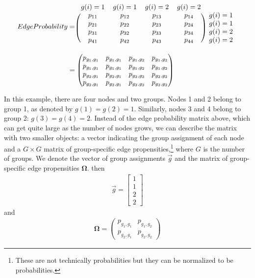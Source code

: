 \documentclass[12pt]{article}
\theoremstyle{definition}
\theoremstyle{plain}
\begin{document}
\begin{align*}
EdgeProbability &= 
\begin{blockarray}{ccccc}
g(i)=1 & g(i)=1 & g(i)=2 & g(i)=2 & \\
\begin{block}{(cccc)c}
p_{11} & p_{12} & p_{13} & p_{14} & g(i)=1  \\
p_{21} & p_{22} & p_{23} & p_{24} & g(i)=1  \\
p_{31} & p_{32} & p_{33} & p_{34} & g(i)=2  \\
p_{41} & p_{42} & p_{43} & p_{44} & g(i)=2  \\
\end{block}
\end{blockarray} \\
&= 
\begin{pmatrix}
p_{g_1,g_1} & p_{g_1,g_1} & p_{g_1,g_2} & p_{g_1,g_2}  \\
p_{g_1,g_1} & p_{g_1,g_1} & p_{g_1,g_2} & p_{g_1,g_2}  \\
p_{g_2,g_1} & p_{g_2,g_1} & p_{g_2,g_2} & p_{g_2,g_2}  \\
p_{g_2,g_1} & p_{g_2,g_1} & p_{g_2,g_2} & p_{g_2,g_2}  \\ 
\end{pmatrix}
\end{align*}

In this example, there are four nodes and two groups. Nodes 1 and 2 belong to group 1, as denoted by $g(1) = g(2) =1$. Similarly, nodes 3 and 4 belong to group 2: $g(3)=g(4)=2$. Instead of the edge probability matrix above, which can get quite large as the number of nodes grows, we can describe the matrix with two smaller objects: a vector indicating the group assignment of each node and a $G\times G$ matrix of group-specific edge propensities,\footnote{These are not technically probabilities but they can be normalized to be probabilities. } where $G$ is the number of groups. We denote the vector of group assignments $\vec{g}$ and the matrix of group-specific edge propensities $\mathbf{\Omega}$. then
\begin{align*}
\vec{g} = \begin{bmatrix}	1 \\ 1 \\ 2\\ 2	\end{bmatrix}
\end{align*}
and 
\begin{align}
\mathbf{\Omega} = \begin{pmatrix}
p_{g_1,g_1} & p_{g_1,g_2} \\
p_{g_2,g_1} & p_{g_2,g_2}
\end{pmatrix}
\end{align}
\end{document}
